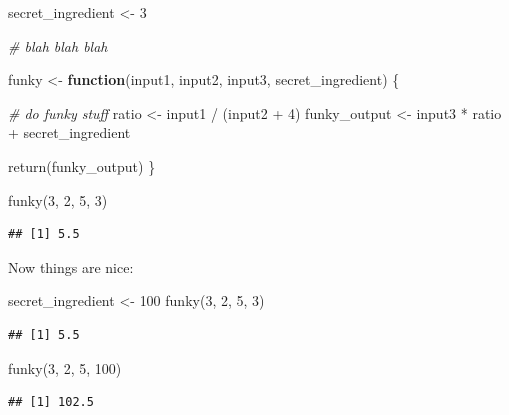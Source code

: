 \documentclass[
]{book}
\newenvironment{Shaded}{\begin{snugshade}}{\end{snugshade}}
\newcommand{\CommentTok}[1]{\textcolor[rgb]{0.56,0.35,0.01}{\textit{#1}}}
\newcommand{\ControlFlowTok}[1]{\textcolor[rgb]{0.13,0.29,0.53}{\textbf{#1}}}
\newcommand{\DecValTok}[1]{\textcolor[rgb]{0.00,0.00,0.81}{#1}}
\newcommand{\FunctionTok}[1]{\textcolor[rgb]{0.00,0.00,0.00}{#1}}
\newcommand{\NormalTok}[1]{#1}
\newcommand{\OtherTok}[1]{\textcolor[rgb]{0.56,0.35,0.01}{#1}}
\newcommand{\SpecialCharTok}[1]{\textcolor[rgb]{0.00,0.00,0.00}{#1}}
\begin{document}
\begin{Shaded}
\begin{Highlighting}[]
\NormalTok{secret\_ingredient }\OtherTok{\textless{}{-}} \DecValTok{3}

\CommentTok{\# blah blah blah}

\NormalTok{funky }\OtherTok{\textless{}{-}} \ControlFlowTok{function}\NormalTok{(input1, input2, input3, secret\_ingredient) \{}
  
  \CommentTok{\# do funky stuff}
\NormalTok{  ratio }\OtherTok{\textless{}{-}}\NormalTok{ input1 }\SpecialCharTok{/}\NormalTok{ (input2 }\SpecialCharTok{+} \DecValTok{4}\NormalTok{)}
\NormalTok{  funky\_output }\OtherTok{\textless{}{-}}\NormalTok{ input3 }\SpecialCharTok{*}\NormalTok{ ratio }\SpecialCharTok{+}\NormalTok{ secret\_ingredient}
  
  \FunctionTok{return}\NormalTok{(funky\_output)  }
\NormalTok{\}}

\FunctionTok{funky}\NormalTok{(}\DecValTok{3}\NormalTok{, }\DecValTok{2}\NormalTok{, }\DecValTok{5}\NormalTok{, }\DecValTok{3}\NormalTok{)}
\end{Highlighting}
\end{Shaded}

\begin{verbatim}
## [1] 5.5
\end{verbatim}

Now things are nice:

\begin{Shaded}
\begin{Highlighting}[]
\NormalTok{secret\_ingredient }\OtherTok{\textless{}{-}} \DecValTok{100}
\FunctionTok{funky}\NormalTok{(}\DecValTok{3}\NormalTok{, }\DecValTok{2}\NormalTok{, }\DecValTok{5}\NormalTok{, }\DecValTok{3}\NormalTok{)}
\end{Highlighting}
\end{Shaded}

\begin{verbatim}
## [1] 5.5
\end{verbatim}

\begin{Shaded}
\begin{Highlighting}[]
\FunctionTok{funky}\NormalTok{(}\DecValTok{3}\NormalTok{, }\DecValTok{2}\NormalTok{, }\DecValTok{5}\NormalTok{, }\DecValTok{100}\NormalTok{)}
\end{Highlighting}
\end{Shaded}

\begin{verbatim}
## [1] 102.5
\end{verbatim}
\end{document}
